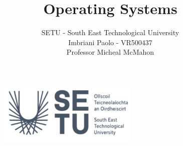 \documentclass[a4paper]{article}
\title{Operating Systems}
\author{SETU - South East Technological University\\Imbriani Paolo - VR500437\\Professor Micheal McMahon}
\begin{document}
\begin{figure}
    \centering
    \includegraphics[width=0.6\textwidth]{SETU.png}
    \label{fig:centered-image}
\end{figure}

\maketitle 

\pagebreak

\tableofcontents

\pagebreak
\end{document}
